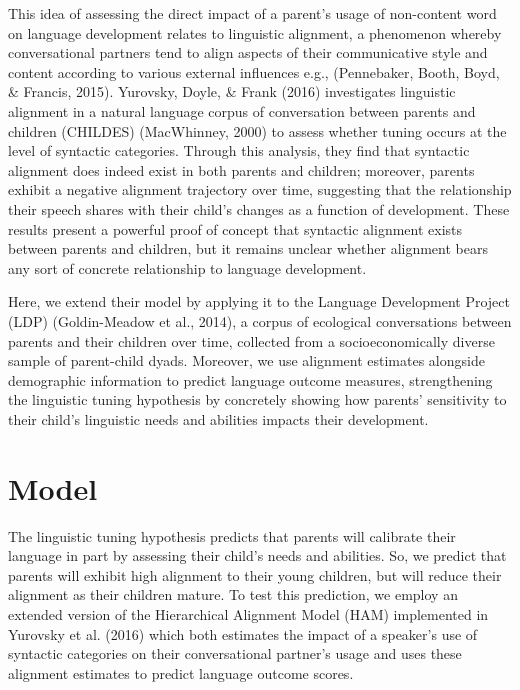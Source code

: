 \documentclass[10pt, letterpaper]{article}
\begin{document}
This idea of assessing the direct impact of a parent's usage of
non-content word on language development relates to linguistic
alignment, a phenomenon whereby conversational partners tend to align
aspects of their communicative style and content according to various
external influences e.g., (Pennebaker, Booth, Boyd, \& Francis, 2015).
Yurovsky, Doyle, \& Frank (2016) investigates linguistic alignment in a
natural language corpus of conversation between parents and children
(CHILDES) (MacWhinney, 2000) to assess whether tuning occurs at the
level of syntactic categories. Through this analysis, they find that
syntactic alignment does indeed exist in both parents and children;
moreover, parents exhibit a negative alignment trajectory over time,
suggesting that the relationship their speech shares with their child's
changes as a function of development. These results present a powerful
proof of concept that syntactic alignment exists between parents and
children, but it remains unclear whether alignment bears any sort of
concrete relationship to language development.

Here, we extend their model by applying it to the Language Development
Project (LDP) (Goldin-Meadow et al., 2014), a corpus of ecological
conversations between parents and their children over time, collected
from a socioeconomically diverse sample of parent-child dyads. Moreover,
we use alignment estimates alongside demographic information to predict
language outcome measures, strengthening the linguistic tuning
hypothesis by concretely showing how parents' sensitivity to their
child's linguistic needs and abilities impacts their development.

\hypertarget{model}{%
\section{Model}\label{model}}

The linguistic tuning hypothesis predicts that parents will calibrate
their language in part by assessing their child's needs and abilities.
So, we predict that parents will exhibit high alignment to their young
children, but will reduce their alignment as their children mature. To
test this prediction, we employ an extended version of the Hierarchical
Alignment Model (HAM) implemented in Yurovsky et al. (2016) which both
estimates the impact of a speaker's use of syntactic categories on their
conversational partner's usage and uses these alignment estimates to
predict language outcome scores.
\end{document}
